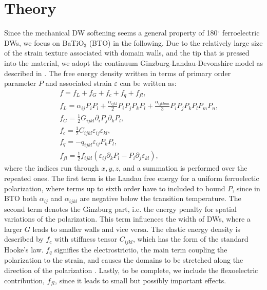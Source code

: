 
\section{Theory}
Since the mechanical DW softening seems a general property of 180$^\circ$ ferroelectric DWs, we focus on BaTiO$_3$ (BTO) in the following.
Due to the relatively large size of the strain texture associated with domain walls, and the tip that is pressed into the material, we adopt the continuum Ginzburg-Landau-Devonshire model as described in \cite{Marton2010}.  
The free energy density written in terms of primary order parameter $P$ and associated strain $\varepsilon$ can be written as:
\begin{eqnarray}\label{eq:BTO_energy}
&&f = f_{L}+f_{G}+f_{c}+f_{q}+f_{fl},\\
&&f_{L} = \alpha_{ij}P_iP_l + \frac{\alpha_{ijkl}}{2}P_{i}P_{j}P_{k}P_{l} + \frac{\alpha_{ijklmn}}{3} P_i P_j P_k P_l P_m P_n,\\
&&f_{G} = \frac{1}{2}G_{ijkl}\partial_i P_j\partial_k P_l,\\
&&f_{c} = \frac{1}{2}C_{ijkl}\varepsilon_{ij}\varepsilon_{kl},\\
&&f_{q}= - q_{ijkl}\varepsilon_{ij}P_{k}P_{l},\label{eq:qpp}\\
&&f_{fl}=\frac{1}{2}f_{ijkl}(\varepsilon_{ij}\partial_k P_l - P_i\partial_j\varepsilon_{kl}),
\end{eqnarray}
where the indices run through ${x,y,z}$, and a summation is performed over the repeated ones.
The first term is the Landau free energy for a uniform ferroelectic polarization, where terms up to sixth order have to included to bound $P$, since in BTO both $\alpha_{ij}$ and $\alpha_{ijkl}$ are negative below the transition temperature.
The second term denotes the Ginzburg part, i.e. the energy penalty for spatial variations of the polarization.
This term influences the width of DWs, where a larger $G$ leads to smaller walls and vice versa.
The elastic energy density is described by $f_c$ with stiffness tensor $C_{ijkl}$, which has the form of the standard Hooke's law.
$f_q$ signifies the electrostrictio, the main term coupling the polarization to the strain, and causes the domains to be stretched along the direction of the polarization .
Lastly, to be complete, we include the flexoelectric contribution, $f_{fl}$, since it leads to small but possibly important effects.


